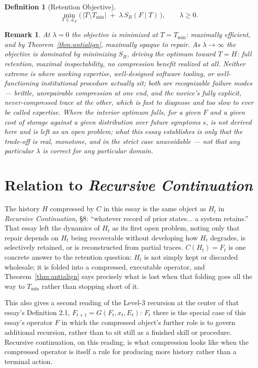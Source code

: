 \documentclass[11pt]{article}
\newtheorem{definition}{Definition}[section]
\newtheorem*{remark}{Remark}
\begin{document}
\begin{definition}[Retention Objective]
\[
\min_{T\in\mathcal{L}_F}\Big(\,|T\setminus T_{\min}| \;+\; \lambda\, S_R(F\mid T)\,\Big), \qquad \lambda\geq0.
\]
\end{definition}

\begin{remark}
At $\lambda=0$ the objective is minimized at $T=T_{\min}$: maximally efficient, and by Theorem~\ref{thm:antialign}, maximally opaque to repair. As $\lambda\to\infty$ the objective is dominated by minimizing $S_R$, driving the optimum toward $T=H$: full retention, maximal inspectability, no compression benefit realized at all. Neither extreme is where working expertise, well-designed software tooling, or well-functioning institutional procedure actually sit; both are recognizable failure modes — brittle, unrepairable compression at one end, and the novice's fully explicit, never-compressed trace at the other, which is fast to diagnose and too slow to ever be called expertise. Where the interior optimum falls, for a given $F$ and a given cost of storage against a given distribution over future symptoms $s$, is not derived here and is left as an open problem; what this essay establishes is only that the trade-off is real, monotone, and in the strict case unavoidable — not that any particular $\lambda$ is correct for any particular domain.
\end{remark}

\section{Relation to \emph{Recursive Continuation}}

The history $H$ compressed by $C$ in this essay is the same object as $H_t$ in \emph{Recursive Continuation}, \S 8: ``whatever record of prior states... a system retains.'' That essay left the dynamics of $H_t$ as its first open problem, noting only that repair depends on $H_t$ being recoverable without developing how $H_t$ degrades, is selectively retained, or is reconstructed from partial traces. $C(H_t)=F_t$ is one concrete answer to the retention question: $H_t$ is not simply kept or discarded wholesale; it is folded into a compressed, executable operator, and Theorem~\ref{thm:antialign} says precisely what is lost when that folding goes all the way to $T_{\min}$ rather than stopping short of it.

This also gives a second reading of the Level-3 recursion at the center of that essay's Definition 2.1, $F_{t+1}=G(F_t,x_t,E_t)$: $F_t$ there is the special case of this essay's operator $F$ in which the compressed object's further role is to govern additional recursion, rather than to sit still as a finished skill or procedure. Recursive continuation, on this reading, is what compression looks like when the compressed operator is itself a rule for producing more history rather than a terminal action.
\end{document}
